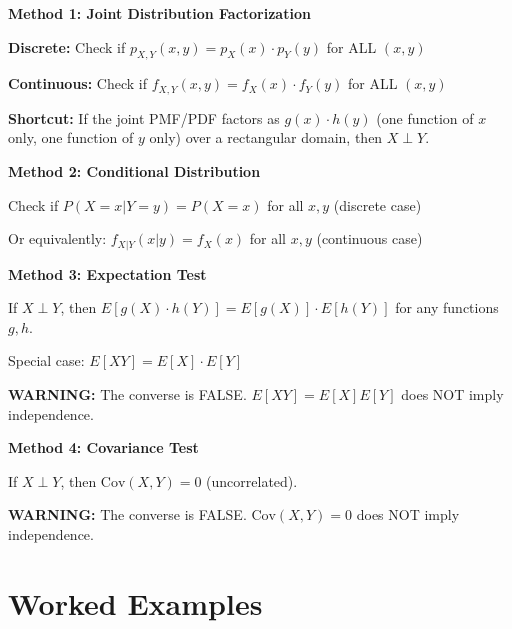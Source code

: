 \documentclass[11pt]{article}
\begin{document}
\begin{tcolorbox}[colback=green!5!white,colframe=green!75!black,title=Testing Independence of Random Variables]

\textbf{Method 1: Joint Distribution Factorization}

\textbf{Discrete:} Check if $p_{X,Y}(x, y) = p_X(x) \cdot p_Y(y)$ for ALL $(x, y)$

\textbf{Continuous:} Check if $f_{X,Y}(x, y) = f_X(x) \cdot f_Y(y)$ for ALL $(x, y)$

\textbf{Shortcut:} If the joint PMF/PDF factors as $g(x) \cdot h(y)$ (one function of $x$ only, one function of $y$ only) over a rectangular domain, then $X \perp Y$.

\vspace{0.3cm}

\textbf{Method 2: Conditional Distribution}

Check if $P(X = x | Y = y) = P(X = x)$ for all $x, y$ (discrete case)

Or equivalently: $f_{X|Y}(x|y) = f_X(x)$ for all $x, y$ (continuous case)

\vspace{0.3cm}

\textbf{Method 3: Expectation Test}

If $X \perp Y$, then $E[g(X) \cdot h(Y)] = E[g(X)] \cdot E[h(Y)]$ for any functions $g, h$.

Special case: $E[XY] = E[X] \cdot E[Y]$

\textbf{WARNING:} The converse is FALSE. $E[XY] = E[X]E[Y]$ does NOT imply independence.

\vspace{0.3cm}

\textbf{Method 4: Covariance Test}

If $X \perp Y$, then $\text{Cov}(X, Y) = 0$ (uncorrelated).

\textbf{WARNING:} The converse is FALSE. $\text{Cov}(X, Y) = 0$ does NOT imply independence.
\end{tcolorbox}

\section{Worked Examples}
\end{document}
